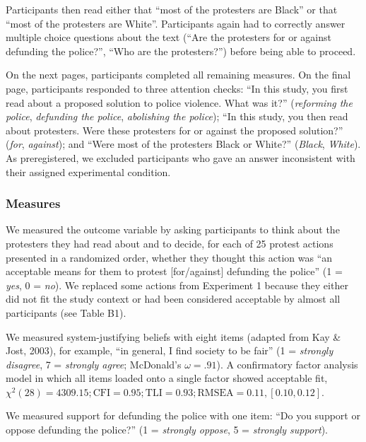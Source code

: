 \documentclass[twocolumn, 11pt, letterpaper]{article}
\begin{document}
\noindent Participants then read either that ``most of the protesters
are Black'' or that ``most of the protesters are White''. Participants
again had to correctly answer multiple choice questions about the text
(``Are the protesters for or against defunding the police?'', ``Who are
the protesters?'') before being able to proceed.

On the next pages, participants completed all remaining measures. On the
final page, participants responded to three attention checks: ``In this
study, you first read about a proposed solution to police violence. What
was it?'' (\emph{reforming the police}, \emph{defunding the police},
\emph{abolishing the police}); ``In this study, you then read about
protesters. Were these protesters for or against the proposed
solution?'' (\emph{for}, \emph{against}); and ``Were most of the
protesters Black or White?'' (\emph{Black}, \emph{White}). As
preregistered, we excluded participants who gave an answer inconsistent
with their assigned experimental condition.

\hypertarget{measures-1}{%
\subsubsection{Measures}\label{measures-1}}

We measured the outcome variable by asking participants to think about
the protesters they had read about and to decide, for each of 25 protest
actions presented in a randomized order, whether they thought this
action was ``an acceptable means for them to protest {[}for/against{]}
defunding the police'' (1 = \emph{yes}, 0 = \emph{no}). We replaced some
actions from Experiment 1 because they either did not fit the study
context or had been considered acceptable by almost all participants
(see Table B1).

We measured system-justifying beliefs with eight items (adapted from Kay
\& Jost, 2003), for example, ``in general, I find society to be fair''
(1 = \emph{strongly disagree}, 7 = \emph{strongly agree}; McDonald's
\(\omega = .91\)). A confirmatory factor analysis model in which all
items loaded onto a single factor showed acceptable fit,
\(\chi^2 (28) = 4309.15; \text{CFI} = 0.95; \text{TLI} = 0.93; \text{RMSEA} = 0.11, [0.10, 0.12]\).

We measured support for defunding the police with one item: ``Do you
support or oppose defunding the police?'' (1 = \emph{strongly oppose}, 5
= \emph{strongly support}).
\end{document}
